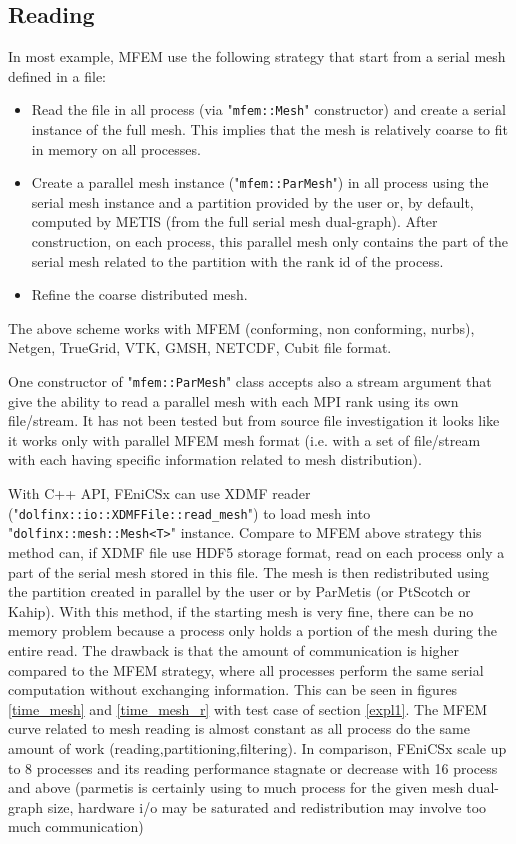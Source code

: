\documentclass[12pt]{article}
\newcommand{\f}[1]{FEniCSx#1}
\newcommand{\mycode}[1]{\textsf{"}\lstinline`#1`\textsf{"}}
\begin{document}
\subsection{Reading\label{Mesh_reading}}
In most example, MFEM use the following strategy that start from a serial mesh defined in a file:
\begin{itemize}
	\item Read the file in all process (via \mycode{mfem::Mesh} constructor) and create a serial  instance of the full mesh. This implies that the mesh is relatively coarse to fit in memory on all processes.
		\item Create a parallel mesh instance (\mycode{mfem::ParMesh}) in all process using the serial mesh instance and a partition provided by the user or, by default, computed by METIS (from the full serial mesh dual-graph). After construction, on each process, this parallel mesh only contains the part of the serial mesh related to the partition with the  rank id of the process.
		\item Refine the coarse distributed mesh.
\end{itemize}






The above scheme works with MFEM (conforming, non conforming, nurbs), Netgen, TrueGrid, VTK, GMSH, NETCDF, Cubit file format.

One constructor of \mycode{mfem::ParMesh} class accepts also a stream argument that give the ability to read a parallel mesh with each MPI rank using its own file/stream. It has not been tested but from source file investigation it looks like it works only with parallel MFEM mesh format (i.e. with a set of file/stream with each having specific information related to mesh distribution). 

With C++ API, \f{} can use XDMF reader (\mycode{dolfinx::io::XDMFFile::read_mesh}) to load mesh into \mycode{dolfinx::mesh::Mesh<T>} instance. Compare to MFEM above strategy this method can, if XDMF file use HDF5 storage format, read on each process only a part of the serial mesh stored in this file.
The mesh is then redistributed using the partition created in parallel by the user or by ParMetis (or PtScotch or Kahip).
With this method, if the starting mesh is very fine, there can be no memory problem because a process only holds a portion of the mesh during the entire read.
 The drawback is that the amount of communication is higher compared to the MFEM strategy, where all processes perform the same serial computation without exchanging information.
 This can be seen in figures \ref{time_mesh} and \ref{time_mesh_r} with test case of section \ref{expl1}. The MFEM curve related to mesh reading is almost constant as all process do the same amount of work (reading,partitioning,filtering). In comparison, \f{} scale up to 8 processes and its reading performance stagnate or decrease with 16 process and above (parmetis is certainly using to much process for the given mesh dual-graph size, hardware i/o may be saturated and redistribution may involve too much communication)   
 
\end{document}
